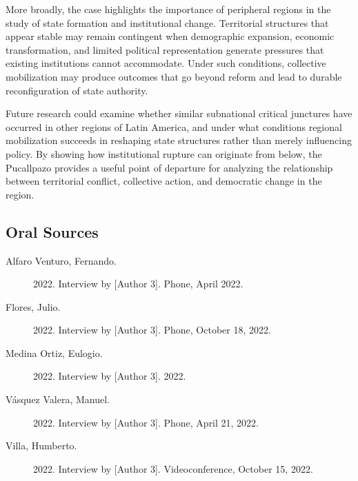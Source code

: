 \documentclass[12pt]{article}
\begin{document}
More broadly, the case highlights the importance of peripheral regions
in the study of state formation and institutional change. Territorial
structures that appear stable may remain contingent when demographic
expansion, economic transformation, and limited political representation
generate pressures that existing institutions cannot accommodate. Under
such conditions, collective mobilization may produce outcomes that go
beyond reform and lead to durable reconfiguration of state authority.

Future research could examine whether similar subnational critical
junctures have occurred in other regions of Latin America, and under
what conditions regional mobilization succeeds in reshaping state
structures rather than merely influencing policy. By showing how
institutional rupture can originate from below, the Pucallpazo provides
a useful point of departure for analyzing the relationship between
territorial conflict, collective action, and democratic change in the
region.

\newpage
\printbibliography[title={References}]

\subsection*{Oral Sources}

\begin{description}
  \item[Alfaro Venturo, Fernando.] 2022. Interview by [Author 3].
    Phone, April 2022.
  \item[Flores, Julio.] 2022. Interview by [Author 3].
    Phone, October 18, 2022.
  \item[Medina Ortiz, Eulogio.] 2022. Interview by [Author 3]. 2022.
  \item[Vásquez Valera, Manuel.] 2022. Interview by [Author 3].
    Phone, April 21, 2022.
  \item[Villa, Humberto.] 2022. Interview by [Author 3].
    Videoconference, October 15, 2022.
\end{description}
\end{document}
